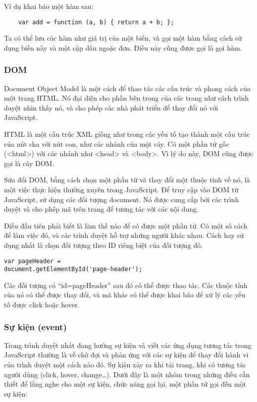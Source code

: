 Ví dụ khai báo một hàm sau:  

\begin{lstlisting}
	var add = function (a, b) { return a + b; }; 
\end{lstlisting}

Ta có thể lưu các hàm như giá trị của một biến, và gọi một hàm bằng cách sử dụng biến này và một cặp dấu ngoặc đơn. Điều này cũng được gọi là gọi hàm.

\subsubsection{DOM}

Document Object Model là một cách để thao tác các cấu trúc và phong cách của một trang HTML. Nó đại diện cho phần bên trong của các trang như cách trình duyệt nhìn thấy nó, và cho phép các nhà phát triển để thay đổi nó với JavaScript.

HTML là một cấu trúc XML giống như trong các yếu tố tạo thành một cấu trúc của nút cha với nút con, như các nhánh của một cây. Có một phần tử gốc (<html>) với các nhánh như <head> và <body>. Vì lý do này, DOM cũng được gọi là cây DOM.

Sửa đổi DOM, bằng cách chọn một phần tử và thay đổi một thuộc tính về nó, là một việc thực hiện thường xuyên trong JavaScript. Để truy cập vào DOM từ JavaScript, sử dụng các đối tượng document. Nó được cung cấp bởi các trình duyệt và cho phép mã trên trang để tương tác với các nội dung.

Điều đầu tiên phải biết là làm thế nào để có được một phần tử. Có một số cách để làm việc đó, và các trình duyệt hỗ trợ những người khác nhau. Cách hay sử dụng nhất là chọn đối tượng theo ID riêng biệt của đối tượng đó.

\begin{lstlisting}
var pageHeader =
document.getElementById('page-header');
\end{lstlisting}

Các đối tượng có “id=pageHeader” sau đó có thể được thao tác. Các thuộc tính của nó có thể được thay đổi, và mã khác có thể được khai báo để xử lý các yếu tố được click hoặc hover.


\subsubsection{Sự kiện (event)}

Trong trình duyệt nhất đang hướng sự kiện và viết các ứng dụng tương tác trong JavaScript thường là về chờ đợi và phản ứng với các sự kiện để thay đổi hành vi của trình duyệt một cách nào đó. Sự kiện xảy ra khi tải trang, khi có tương tác người dùng (click, hover, change…). Dưới đây là một nhóm trong những điều cần thiết để lắng nghe cho một sự kiện, chức năng gọi lại, một phần tử gọi đến một sự kiện:
 
